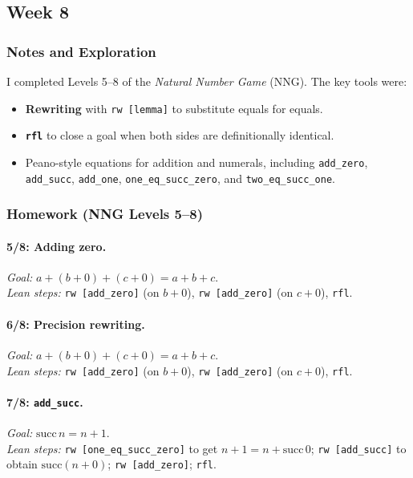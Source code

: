 \documentclass[11pt]{article}
\begin{document}
\subsection{Week 8}

\subsubsection{Notes and Exploration}
I completed Levels 5--8 of the \emph{Natural Number Game} (NNG). The key tools were:
\begin{itemize}[leftmargin=1.4em]
  \item \textbf{Rewriting} with \texttt{rw [lemma]} to substitute equals for equals.
  \item \textbf{\texttt{rfl}} to close a goal when both sides are definitionally identical.
  \item Peano-style equations for addition and numerals, including \texttt{add\_zero}, \texttt{add\_succ}, \texttt{add\_one}, \texttt{one\_eq\_succ\_zero}, and \texttt{two\_eq\_succ\_one}.
\end{itemize}

\subsubsection{Homework (NNG Levels 5--8)}
\paragraph{5/8: Adding zero.} \emph{Goal:} $a + (b+0) + (c+0) = a+b+c$.\\
\emph{Lean steps:} \texttt{rw [add\_zero]} (on $b+0$), \texttt{rw [add\_zero]} (on $c+0$), \texttt{rfl}.

\paragraph{6/8: Precision rewriting.} \emph{Goal:} $a + (b+0) + (c+0) = a+b+c$.\\
\emph{Lean steps:} \texttt{rw [add\_zero]} (on $b+0$), \texttt{rw [add\_zero]} (on $c+0$), \texttt{rfl}.

\paragraph{7/8: \texttt{add\_succ}.} \emph{Goal:} $\mathrm{succ}\,n = n+1$.\\
\emph{Lean steps:} \texttt{rw [one\_eq\_succ\_zero]} to get $n+1=n+\mathrm{succ}\,0$; \texttt{rw [add\_succ]} to obtain $\mathrm{succ}(n+0)$; \texttt{rw [add\_zero]}; \texttt{rfl}.
\end{document}
